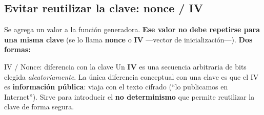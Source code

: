 \documentclass[11pt,a4paper]{article}
\begin{document}
\subsection{Evitar reutilizar la clave: nonce / IV}

\begin{slidebox}
Se agrega un valor a la función generadora. \textbf{Ese valor no debe repetirse para una
misma clave} (se lo llama \textbf{nonce} o \textbf{IV} —vector de inicialización—).
\textbf{Dos formas:}
\end{slidebox}

\begin{defbox}{IV / Nonce: diferencia con la clave}
Un \textbf{IV} es una secuencia arbitraria de bits elegida \emph{aleatoriamente}. La única
diferencia conceptual con una clave es que el IV es \textbf{información pública}: viaja
con el texto cifrado (``lo publicamos en Internet''). Sirve para introducir el
\textbf{no determinismo} que permite reutilizar la clave de forma segura.
\end{defbox}
\end{document}
